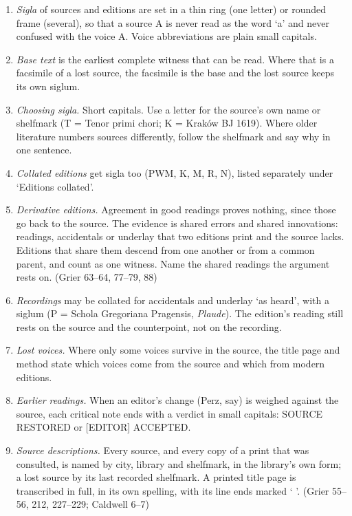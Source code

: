\begin{enumerate}

\tightlist
\item
  \textit{Sigla} of sources and editions are set in a thin ring (one letter) or rounded frame (several), so that a source A is never read as the word ‘a’ and never confused with the voice A. Voice abbreviations are plain small capitals.
\item
  \textit{Base text} is the earliest complete witness that can be read. Where that is a facsimile of a lost source, the facsimile is the base and the lost source keeps its own siglum.
\item
  \textit{Choosing sigla.} Short capitals. Use a letter for the source's own name or shelfmark (T = Tenor primi chori; K = Kraków BJ 1619). Where older literature numbers sources differently, follow the shelfmark and say why in one sentence.
\item
  \textit{Collated editions} get sigla too (PWM, K, M, R, N), listed separately under ‘Editions collated’.
\item
  \textit{Derivative editions.} Agreement in good readings proves nothing, since those go back to the source. The evidence is shared errors and shared innovations: readings, accidentals or underlay that two editions print and the source lacks. Editions that share them descend from one another or from a common parent, and count as one witness. Name the shared readings the argument rests on. (Grier 63--64, 77--79, 88)
\item
  \textit{Recordings} may be collated for accidentals and underlay ‘as heard’, with a siglum (P = Schola Gregoriana Pragensis, \emph{Plaude}). The edition's reading still rests on the source and the counterpoint, not on the recording.
\item
  \textit{Lost voices.} Where only some voices survive in the source, the title page and method state which voices come from the source and which from modern editions.
\item
  \textit{Earlier readings.} When an editor's change (Perz, say) is weighed against the source, each critical note ends with a verdict in small capitals: SOURCE RESTORED or {[}EDITOR{]} ACCEPTED.
\item
  \textit{Source descriptions.} Every source, and every copy of a print that was consulted, is named by city, library and shelfmark, in the library's own form; a lost source by its last recorded shelfmark. A printed title page is transcribed in full, in its own spelling, with its line ends marked ` \textbar{} '. (Grier 55--56, 212, 227--229; Caldwell 6--7)
\end{enumerate}

